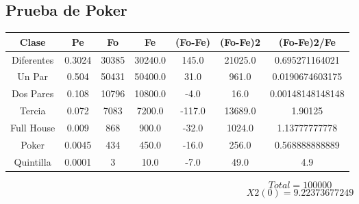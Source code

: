 \documentclass{article}
\begin{document}
\subsection{Prueba de Poker}
\begin{tabular}{|c|c|c|c|c|c|c|}
Clase&Pe&Fo&Fe&(Fo{-}Fe)&(Fo{-}Fe)2&(Fo{-}Fe)2/Fe\\
\hline
Diferentes&0.3024&30385&30240.0&145.0&21025.0&0.695271164021\\
\hline
Un Par&0.504&50431&50400.0&31.0&961.0&0.0190674603175\\
\hline
Dos Pares&0.108&10796&10800.0&{-}4.0&16.0&0.00148148148148\\
\hline
Tercia&0.072&7083&7200.0&{-}117.0&13689.0&1.90125\\
\hline
Full House&0.009&868&900.0&{-}32.0&1024.0&1.13777777778\\
\hline
Poker&0.0045&434&450.0&{-}16.0&256.0&0.568888888889\\
\hline
Quintilla&0.0001&3&10.0&{-}7.0&49.0&4.9\\
\end{tabular}
$$
Total = 100000
$$
$$
X2(0) = 9.22373677249
$$
\end{document}
